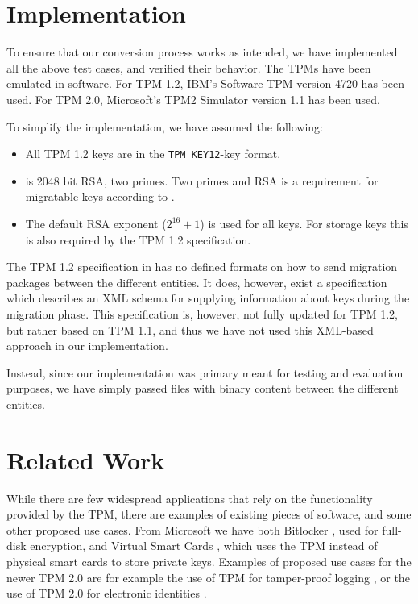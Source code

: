 {\section{Implementation} \label{sec:tpm12to20:implementation}
To ensure that our conversion process works as intended, we have implemented all the above test cases, and verified their behavior. The TPMs have been emulated in software. For TPM 1.2, IBM's Software TPM version 4720 \cite{ibmswtpm} has been used. For TPM 2.0, Microsoft's TPM2 Simulator version 1.1 \cite{mstpm2sim} has been used.

To simplify the implementation, we have assumed the following:

\begin{itemize}
	\item All TPM 1.2 keys are in the \texttt{TPM\_KEY12}-key format.
	\item \ek{} is 2048 bit RSA, two primes. Two primes and RSA is a requirement for migratable keys according to \cite[Part 2, Sec. 10.7]{TPM1.2spec}. %
	\item The default RSA exponent ($2^{16}+1$) is used for all keys. For storage keys this is also required by the TPM 1.2 specification. %
\end{itemize}

The TPM 1.2 specification in \cite{TPM1.2spec} has no defined formats on how to send migration packages between the different entities. It does, however, exist a specification \cite{TPMmigrationservices-tcg} which describes an XML schema for supplying information about keys during the migration phase. This specification is, however, not fully updated for TPM 1.2, but rather based on TPM 1.1, and thus we have not used this XML-based approach in our implementation.

Instead, since our implementation was primary meant for testing and evaluation purposes, we have simply passed files with binary content between the different entities.

\section{Related Work} \label{sec:tpm12to20:relatedwork}
While there are few widespread applications that rely on the functionality provided by the TPM, there are examples of existing pieces of software, and some other proposed use cases. From Microsoft we have both Bitlocker \cite{Bitlocker}, used for full-disk encryption, and Virtual Smart Cards \cite{microsoft-vsc}, which uses the TPM instead of physical smart cards to store private keys.
Examples of proposed use cases for the newer TPM 2.0 are for example the use of TPM for tamper-proof logging \cite{sinha:2014}, or the use of TPM 2.0 for electronic identities \cite{nyman:2014}.

}
